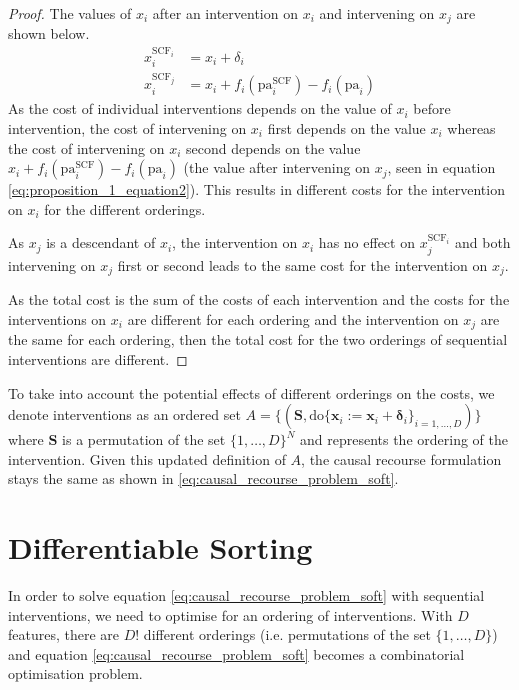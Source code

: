 \begin{proof}
	The values of $x_i$ after an intervention on $x_i$ and intervening on $x_j$ are shown below.
	\begin{align} \label{eq:proposition_1_equation}
		x^{\text{SCF}_i}_i & = x_i + \delta_i \\ \label{eq:proposition_1_equation2}
		x^{\text{SCF}_j}_i & = x_i + f_i(\text{pa}^{\text{SCF}}_i) - f_i(\text{pa}_i)
	\end{align}
	As the cost of individual interventions depends on the value of $x_i$ before intervention, the cost of intervening on $x_i$ first depends on the value $x_i$ whereas the cost of intervening on $x_i$ second depends on the value $x_i + f_i(\text{pa}^{\text{SCF}}_i) - f_i(\text{pa}_i)$ (the value after intervening on $x_j$, seen in equation \ref{eq:proposition_1_equation2}). This results in different costs for the intervention on $x_i$ for the different orderings.
	
	As $x_j$ is a descendant of $x_i$, the intervention on $x_i$ has no effect on $x^{\text{SCF}_i}_j$ and both intervening on $x_j$ first or second leads to the same cost for the intervention on $x_j$.
	
	As the total cost is the sum of the costs of each intervention and the costs for the interventions on $x_i$ are different for each ordering and the intervention on $x_j$ are the same for each ordering, then the total cost for the two orderings of sequential interventions are different. 
\end{proof}

To take into account the potential effects of different orderings on the costs, we denote interventions as an ordered set $A = \big\{(\mathbf{S}, \text{do} \{\boldsymbol{x}_i:=\boldsymbol{x}_i + \boldsymbol{\delta}_i\}_{i=1, \ldots, D})\big\}$ where $\mathbf{S}$ is a permutation of the set $\{1, \ldots, D\}^N$ and represents the ordering of the intervention. Given this updated definition of $A$, the causal recourse formulation stays the same as shown in \ref{eq:causal_recourse_problem_soft}.

\section{Differentiable Sorting}

In order to solve equation \ref{eq:causal_recourse_problem_soft} with sequential interventions, we need to optimise for an ordering of interventions. With $D$ features, there are $D!$ different orderings (i.e. permutations of the set $\{1, \ldots, D\}$) and equation \ref{eq:causal_recourse_problem_soft} becomes a combinatorial optimisation problem.


